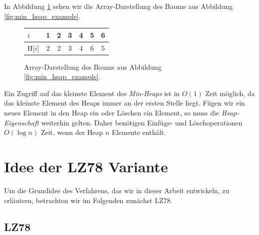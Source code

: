 \documentclass[a4paper,11pt]{scrartcl}%
\theoremstyle{change}
\theoremstyle{nonumberplain}
\theoremstyle{change}
\theoremstyle{nonumberplain}
\theoremstyle{change}
\theoremstyle{nonumberplain}
\begin{document}
In Abbildung \ref{fig:array_heap} sehen wir die Array-Darstellung des Baums aus Abbildung \ref{fig:min_heap_example}.

\begin{figure}[h]
	\centering
	
		\begin{tabular}[h]{|l|c|c|c|c|c|c|}\hline
			$i$ & 1 & 2 & 3 & 4 & 5 & 6\\ \hline
		   H[$i$] & 2 & 2 & 3 & 4 & 6 & 5\\ \hline
		   
		\end{tabular} 
		\caption{Array-Darstellung des Baums aus Abbildung \ref{fig:min_heap_example}.}
		\label{fig:array_heap}
\end{figure}

Ein Zugriff auf das kleinste Element des \textit{Min-Heaps} ist in $O(1)$ Zeit möglich, da das kleinste Element des Heaps immer an der ersten Stelle liegt.
Fügen wir ein neues Element in den Heap ein oder Löschen ein Element, so muss die \textit{Heap-Eigenschaft} weiterhin gelten. Daher benötigen Einfüge- und Löschoperationen $O(\log n)$ Zeit, wenn der Heap $n$ Elemente enthält. \cite[S.115ff]{introductionToAlgorithms}

	
\section{Idee der LZ78 Variante}

Um die Grundidee des Verfahrens, das wir in dieser Arbeit entwickeln, zu erläutern, betrachten wir im Folgenden zunächst LZ78.

\subsection{LZ78}\label{lz78_sec}
\end{document}
